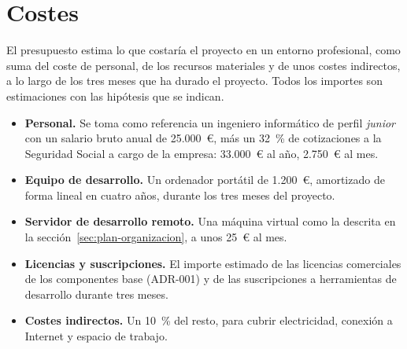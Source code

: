 \section{Costes}
\label{sec:plan-costes}

El presupuesto estima lo que costaría el proyecto en un entorno profesional,
como suma del coste de personal, de los recursos materiales y de unos costes
indirectos, a lo largo de los tres meses que ha durado el proyecto. Todos los
importes son estimaciones con las hipótesis que se indican.

\begin{itemize}
  \item \textbf{Personal.} Se toma como referencia un ingeniero informático de
        perfil \textit{junior} con un salario bruto anual de 25.000~€, más
        un 32~\% de cotizaciones a la Seguridad Social a cargo de la empresa:
        33.000~€ al año, 2.750~€ al mes.
  \item \textbf{Equipo de desarrollo.} Un ordenador portátil de 1.200~€,
        amortizado de forma lineal en cuatro años, durante los tres meses del
        proyecto.
  \item \textbf{Servidor de desarrollo remoto.} Una máquina virtual como la
        descrita en la sección~\ref{sec:plan-organizacion}, a unos 25~€ al
        mes.
  \item \textbf{Licencias y suscripciones.} El importe estimado de las
        licencias comerciales de los componentes base (ADR-001) y de las
        suscripciones a herramientas de desarrollo durante tres meses.
  \item \textbf{Costes indirectos.} Un 10~\% del resto, para cubrir
        electricidad, conexión a Internet y espacio de trabajo.
\end{itemize}

